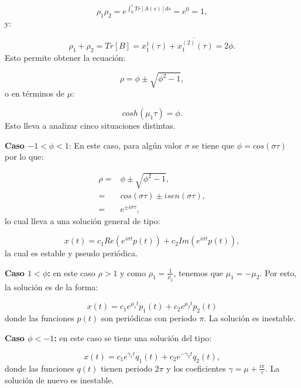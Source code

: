 \documentclass[a4paper,10pt]{report}
\begin{document}
\begin{equation}
\rho_1 \rho_2 = e^{\int_0^\tau Tr[A(s)]ds} = e^0 = 1,
\end{equation} y:

\begin{equation}
\rho_1 + \rho_2 = Tr[B] =x_1^1(\tau)+ \dot{x_1^{(2)}(\tau)} = 2\phi.
\end{equation} Esto permite obtener la ecuación:

\begin{equation}
\rho = \phi \pm \sqrt{\phi^2 -1},
\end{equation} o en términos de $\mu$:

\begin{equation}
cosh(\mu_1 \tau) = \phi.
\end{equation} Esto lleva a analizar cinco situaciones distintas.

\textbf{Caso $ -1 < \phi < 1$}: En este caso, para algún valor $\sigma$ se tiene que $\phi = cos(\sigma \tau)$ por lo que:

\begin{align*}
\rho =& \phi \pm \sqrt{\phi^2 -1},\\
=& cos(\sigma \tau) \pm isen(\sigma \tau), \\
=& e^{\pm i\sigma \tau},
\end{align*} lo cual lleva a una solución general de tipo:

\begin{equation}
x(t) = c_1 Re(e^{i\sigma t} p(t)) + c_2 Im(e^{i\sigma t} p(t)),
\end{equation} la cual es estable y pseudo periódica.

\textbf{Caso $1 < \phi$:} en este caso $\rho > 1$ y como $\rho_1 = \frac{1}{\rho_2}$, tenemos que $\mu_1 = -\mu_2$. Por esto, la solución es de la forma:

\begin{equation}
x(t) = c_1 e^{\mu_1 t}p_1(t) + c_2 e^{\mu_2 t}p_2(t)
\end{equation} donde las funciones $p(t)$ son periódicas con periodo $\pi$. La solución es inestable.

\textbf{Caso $\phi < -1$:} en este caso se tiene una solución del tipo:

\begin{equation}
x(t) =c_1 e^{\gamma_1 t}q_1(t) + c_2 e^{-\gamma_2 t}q_2(t),
\end{equation} donde las funciones $q(t)$ tienen periodo $2\pi$ y los coeficientes $\gamma = \mu + \frac{i\pi}{\tau}$. La solución de nuevo es inestable.
\end{document}
